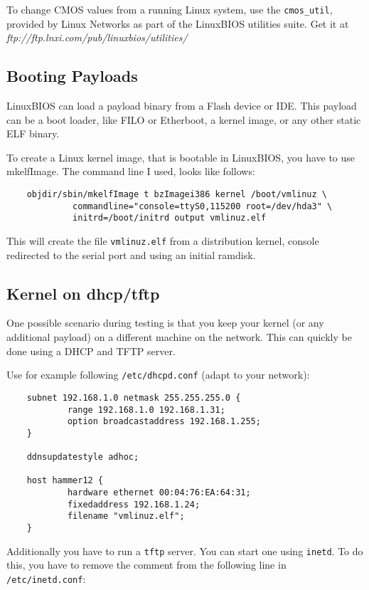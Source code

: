 \documentclass[titlepage,12pt]{article}
\begin{document}
To change CMOS values from a running Linux system, use the
\texttt{cmos\_util}, provided by Linux Networks as part of the LinuxBIOS
utilities suite. Get it at
\textit{ftp://ftp.lnxi.com/pub/linuxbios/utilities/}

\subsection {Booting Payloads}
LinuxBIOS can load a payload binary from a Flash device or IDE. This
payload can be a boot loader, like FILO or Etherboot, a kernel image, or
any other static ELF binary.

To create a Linux kernel image, that is bootable in LinuxBIOS, you have
to use mkelfImage. The command line I used, looks like follows:

\begin{verbatim}
    objdir/sbin/mkelfImage t bzImagei386 kernel /boot/vmlinuz \
             commandline="console=ttyS0,115200 root=/dev/hda3" \
             initrd=/boot/initrd output vmlinuz.elf
\end{verbatim}


This will create the file \texttt{vmlinuz.elf} from a distribution
kernel, console redirected to the serial port and using an initial
ramdisk.

\subsection{Kernel on dhcp/tftp}

One possible scenario during testing is that you keep your kernel (or
any additional payload) on a different machine on the network. This can
quickly be done using a DHCP and TFTP server.

Use for example following \texttt{/etc/dhcpd.conf} (adapt to your
network):

\begin{verbatim}
    subnet 192.168.1.0 netmask 255.255.255.0 {
            range 192.168.1.0 192.168.1.31;
            option broadcastaddress 192.168.1.255;
    }
    
    ddnsupdatestyle adhoc;
    
    host hammer12 {
            hardware ethernet 00:04:76:EA:64:31;
            fixedaddress 192.168.1.24;
            filename "vmlinuz.elf";
    }
\end{verbatim}


Additionally you have to run a \texttt{tftp} server. You can start one
using \texttt{inetd}.  To do this, you have to remove the comment from
the following line in \texttt{/etc/inetd.conf}:
\end{document}
